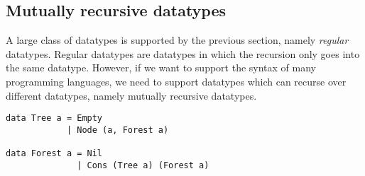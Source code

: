 \subsection{Mutually recursive datatypes}
A large class of datatypes is supported by the previous section, namely \textit{regular} datatypes. Regular datatypes are datatypes in which the recursion only goes into the same datatype. However, if we want to support the syntax of many programming languages, we need to support datatypes which can recurse over different datatypes, namely mutually recursive datatypes.

\begin{verbatim}
data Tree a = Empty 
            | Node (a, Forest a)

data Forest a = Nil
              | Cons (Tree a) (Forest a)
\end{verbatim}

